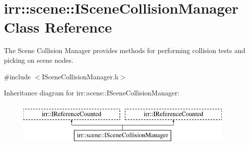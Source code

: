 \hypertarget{classirr_1_1scene_1_1ISceneCollisionManager}{}\section{irr\+:\+:scene\+:\+:I\+Scene\+Collision\+Manager Class Reference}
\label{classirr_1_1scene_1_1ISceneCollisionManager}


The Scene Collision Manager provides methods for performing collision tests and picking on scene nodes.  




{\ttfamily \#include $<$I\+Scene\+Collision\+Manager.\+h$>$}

Inheritance diagram for irr\+:\+:scene\+:\+:I\+Scene\+Collision\+Manager\+:\begin{figure}[H]
\begin{center}
\leavevmode
\includegraphics[height=2.000000cm]{classirr_1_1scene_1_1ISceneCollisionManager}
\end{center}
\end{figure}

